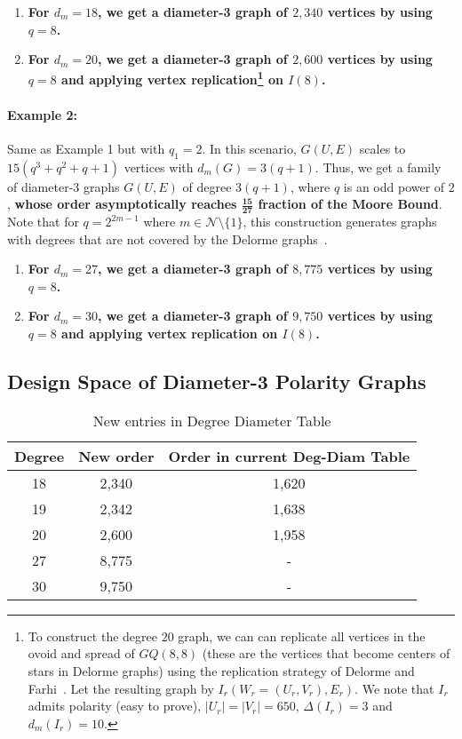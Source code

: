 \begin{enumerate}
    \item \textbf{For $d_{m}=18$, we get a diameter-3 graph of $2,340$ vertices by using
    $q=8$.}

    \item \textbf{For $d_{m}=20$, we get a diameter-3 graph of $2,600$ vertices by using
    $q=8$ and applying vertex replication\footnote{To construct the degree 
    $20$ graph, we can can replicate all vertices in the ovoid and spread of $GQ(8,8)$ (these are the vertices that become centers of stars in Delorme graphs) using the replication strategy
    of Delorme and Farhi~\cite{delorme1984large}. Let the resulting
    graph by $I_r(W_r=(U_r,V_r), E_r)$.
    We note that $I_r$ admits polarity (easy to prove), $|U_r|=|V_r|=650$, $\Delta(I_r)=3$ and $d_{m}(I_r)=10$.
} on $I(8)$.}
\end{enumerate}


\paragraph{Example 2:} Same as Example 1 but with
$q_1=2$. In this scenario, $G(U,E)$ scales to
$15(q^3 + q^2 + q + 1)$ vertices with $d_m(G)=3(q+1)$.
Thus, we get a family of diameter-3 graphs $G(U,E)$
of degree $3(q+1)$, where $q$ is an odd power of $2$, \textbf{whose order asymptotically reaches $\mathbf{\frac{15}{27}}$ fraction of the
Moore Bound}. Note that for $q = 2^{2m-1}$ where $m\in \mathcal{N}\setminus \{1\}$, this 
construction generates graphs with degrees that are
not covered by the Delorme graphs~\cite{delorme1985grands}.
\begin{enumerate}
    \item \textbf{For $d_{m}=27$, we get a diameter-3 graph of $8,775$ vertices by using
    $q=8$.}
    \item \textbf{For $d_{m}=30$, we get a diameter-3 graph of $9,750$ vertices by using
    $q=8$ and applying vertex replication on $I(8)$.}


\end{enumerate}


\subsection{Design Space of Diameter-3 Polarity Graphs}

\begin{table}[htbp]
\centering
\caption{New entries in Degree Diameter Table}
\label{table:new_points}
\begin{tabular}{ccc}\hline
\textbf{Degree}                                & \textbf{New order} &
\textbf{Order in current Deg-Diam Table}\\ \midrule
18 & 2,340 & 1,620 \\
19 & 2,342 & 1,638 \\
20 & 2,600 & 1,958 \\
27 & 8,775 & - \\
30 & 9,750 & - \\
 \bottomrule
\end{tabular}
\end{table}


